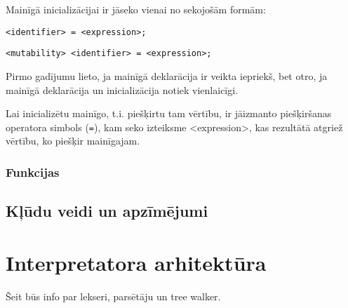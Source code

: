 \documentclass[12pt,a4paper]{report}
\begin{document}
Mainīgā inicializācijai ir jāseko vienai no sekojošām formām:

\begin{verbatim}
<identifier> = <expression>;
\end{verbatim}  

\begin{verbatim}
<mutability> <identifier> = <expression>;
\end{verbatim}  

Pirmo gadījumu lieto, ja mainīgā deklarācija ir veikta iepriekš, bet otro, ja mainīgā deklarācija un inicializācija notiek vienlaicīgi.

Lai inicializētu mainīgo, t.i. piešķirtu tam vērtību, ir jāizmanto piešķiršanas operatora simbols (\texttt{=}), kam seko izteiksme <expression>, kas rezultātā atgriež vērtību, ko piešķir mainīgajam.

\subsection{Funkcijas}


\section{Kļūdu veidi un apzīmējumi}

\chapter{Interpretatora arhitektūra}
\label{chap:arch}

Šeit būs info par lekseri, parsētāju un tree walker.



   
\end{document}
